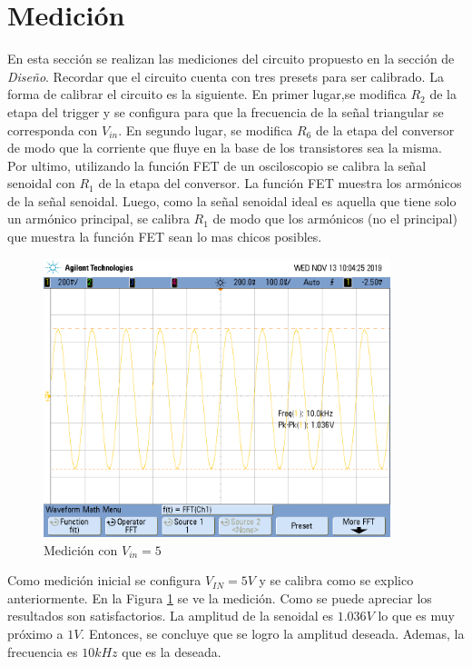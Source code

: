 \section{Medición}

En esta sección se realizan las mediciones del circuito propuesto en la sección de \textit{Diseño}. Recordar que el circuito cuenta con tres presets para ser calibrado. La forma de calibrar el circuito es la siguiente. En primer lugar,se modifica $R_2$ de la etapa del trigger y se configura para que la frecuencia de la señal triangular se corresponda con $V_{in}$. En segundo lugar, se modifica $R_6$ de la etapa del conversor de modo que la corriente que fluye en la base de los transistores sea la misma. Por ultimo, utilizando la función FET de un osciloscopio se calibra la señal senoidal con $R_1$ de la etapa del conversor. La función FET muestra los armónicos de la señal senoidal. Luego, como la señal senoidal ideal es aquella que tiene solo un armónico principal, se calibra $R_1$ de modo que los armónicos (no el principal) que muestra la función FET sean lo mas chicos posibles. 

\begin{figure}[h!]                                                       
    \centering\includegraphics[width=0.9\textwidth]{../Ex3/Resources/med_senoidal_5v.png}
    \caption{Medición con $V_{in} = 5$}
    \label{fig:med_5v}
    \end{figure}

Como medición inicial se configura $V_{IN} = 5V$ y se calibra como se explico anteriormente. En la Figura \ref{fig:med_5v} se ve la medición. Como se puede apreciar los resultados son satisfactorios. La amplitud de la senoidal es $1.036V$ lo que es muy próximo a $1V$. Entonces, se concluye que se logro la amplitud deseada. Ademas, la frecuencia es $10kHz$ que es la deseada. 

